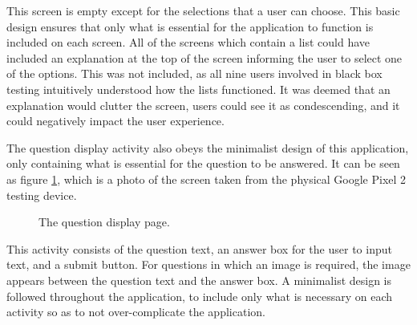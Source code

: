 \documentclass{article}
\begin{document}
This screen is empty except for the selections that a user can choose. This basic design ensures that only what is essential for the application to function is included on each screen. All of the screens which contain a list could have included an explanation at the top of the screen informing the user to select one of the options. This was not included, as all nine users involved in black box testing intuitively understood how the lists functioned. It was deemed that an explanation would clutter the screen, users could see it as condescending, and it could negatively impact the user experience. \par

The question display activity also obeys the minimalist design of this application, only containing what is essential for the question to be answered. It can be seen as figure \ref{figure:applicationQuestionPage}, which is a photo of the screen taken from the physical Google Pixel 2 testing device.

\begin{figure}[H]
	\centering
	\caption{The question display page.}
	\label{figure:applicationQuestionPage}
\end{figure}

This activity consists of the question text, an answer box for the user to input text, and a submit button. For questions in which an image is required, the image appears between the question text and the answer box. A minimalist design is followed throughout the application, to include only what is necessary on each activity so as to not over-complicate the application. \par
\end{document}
